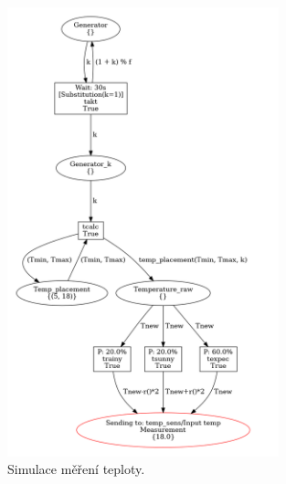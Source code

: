 \begin{figure}[htb]
  \centering
  \includegraphics[width=0.7\textwidth]{obrazky-figures/thermometr.png}
  \caption{Simulace měření teploty.}
  \label{thermometr-viz}
\end{figure}

